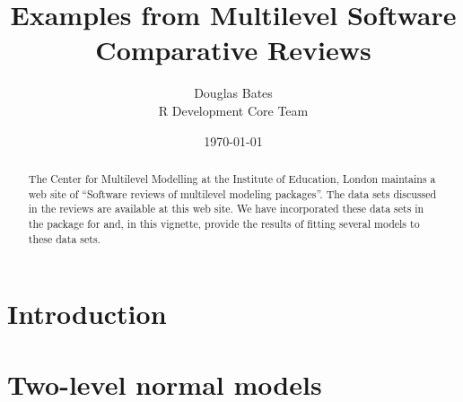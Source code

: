\documentclass[12pt]{article}
\begin{document}
\title{Examples from Multilevel Software Comparative Reviews}
\author{Douglas Bates\\R Development Core Team\\}
\date{\today}
\maketitle
\begin{abstract}
   The Center for Multilevel Modelling at the Institute of Education,
   London maintains a web site of ``Software reviews of multilevel
   modeling packages''.  The data sets discussed in the reviews are
   available at this web site.  We have incorporated these data sets
   in the  package for \RR{} and, in this vignette, provide
   the results of fitting several models to these data sets.
\end{abstract}

\section{Introduction}
\label{sec:Intro}


\section{Two-level normal models}
\label{sec:TwoLevelNormal}
\end{document}

